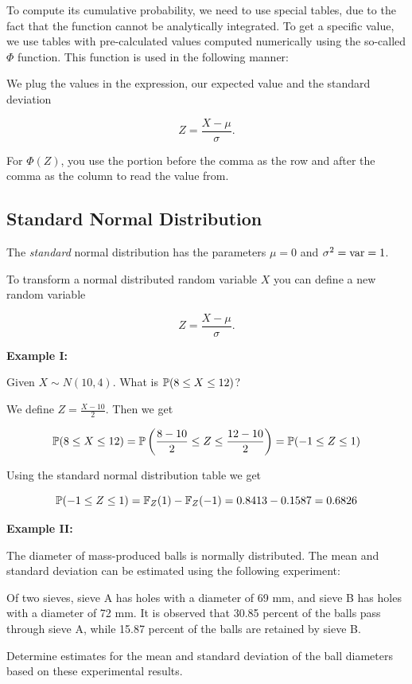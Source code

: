 To compute its cumulative probability, we need to use special tables, due to the fact that the function cannot be analytically integrated. 
To get a specific value, we use tables with pre-calculated values computed numerically using the so-called \(\Phi\) function. 
This function is used in the following manner:

We plug the values in the expression, our expected value and the standard deviation 

\[
    Z = \frac{X - \mu}{\sigma}.
\]

For \(\Phi(Z)\), you use the portion before the comma as the row and after the comma as the column to read the value from.

\subsection{Standard Normal Distribution}

The \emph{standard} normal distribution has the parameters \(\mu = 0\) and \(\sigma^2 = \mathrm{var} = 1\). 

To transform a normal distributed random variable \(X\) you can define a new random variable 

\[
    Z = \frac{X - \mu}{\sigma}.
\]

\textbf{Example I:}

Given \(X \sim N(10, 4)\). What is \(\mathbb{P}(8 \le X \le 12)\)?

We define \(Z = \frac{X - 10}{2}\). Then we get 

\[
    \mathbb{P}(8 \le X \le 12) = \mathbb{P}\left(\frac{8 - 10}{2} \le Z \le \frac{12 - 10}{2}\right) = \mathbb{P}(-1 \le Z \le 1)
\]

Using the standard normal distribution table we get

\[
    \mathbb{P}(-1 \le Z \le 1) = \mathbb{F}_Z(1) - \mathbb{F}_Z(-1) = 0.8413 - 0.1587 = 0.6826
\]

\textbf{Example II:}

The diameter of mass-produced balls is normally distributed. The mean and standard deviation can be estimated using the following experiment:

Of two sieves, sieve A has holes with a diameter of 69 mm, and sieve B has holes with a diameter of 72 mm. It is observed that 30.85 percent 
of the balls pass through sieve A, while 15.87 percent of the balls are retained by sieve B.

Determine estimates for the mean and standard deviation of the ball diameters based on these experimental results.

